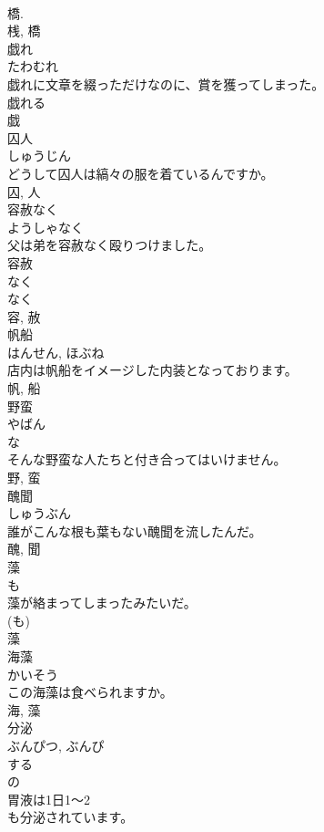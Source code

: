 \documentclass[8pt]{extreport}
\begin{document}
\begin{CJK}{UTF8}{min}
\\	橋. 
\\	桟, 橋	
\\	戯れ	
\\	たわむれ	
\\	戯れに文章を綴っただけなのに、賞を獲ってしまった。	
\\	戯れる 
\\	戯	
\\	囚人	
\\	しゅうじん	
\\	どうして囚人は縞々の服を着ているんですか。	
\\	囚, 人	
\\	容赦なく	
\\	ようしゃなく	
\\	父は弟を容赦なく殴りつけました。	
\\	容赦 
\\	なく 
\\	なく 
\\	容, 赦	
\\	帆船	
\\	はんせん, ほぶね	
\\	店内は帆船をイメージした内装となっております。	
\\	帆, 船	
\\	野蛮	
\\	やばん	
\\	な 
\\	そんな野蛮な人たちと付き合ってはいけません。	
\\	野, 蛮	
\\	醜聞	
\\	しゅうぶん	
\\	誰がこんな根も葉もない醜聞を流したんだ。	
\\	醜, 聞	
\\	藻	
\\	も	
\\	藻が絡まってしまったみたいだ。	
\\	(も) 
\\	藻	
\\	海藻	
\\	かいそう	
\\	この海藻は食べられますか。	
\\	海, 藻	
\\	分泌	
\\	ぶんぴつ, ぶんぴ	
\\	する 
\\	の 
\\	胃液は1日1～2
\\	も分泌されています。	

\end{CJK}
\end{document}
